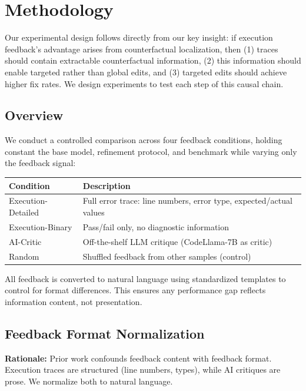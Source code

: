 \section{Methodology}
\label{sec:methodology}

Our experimental design follows directly from our key insight: if execution feedback's advantage arises from counterfactual localization, then (1) traces should contain extractable counterfactual information, (2) this information should enable targeted rather than global edits, and (3) targeted edits should achieve higher fix rates. We design experiments to test each step of this causal chain.

\subsection{Overview}

We conduct a controlled comparison across four feedback conditions, holding constant the base model, refinement protocol, and benchmark while varying only the feedback signal:

\begin{table}[h]
\centering
\begin{tabular}{ll}
\toprule
\textbf{Condition} & \textbf{Description} \\
\midrule
Execution-Detailed & Full error trace: line numbers, error type, expected/actual values \\
Execution-Binary & Pass/fail only, no diagnostic information \\
AI-Critic & Off-the-shelf LLM critique (CodeLlama-7B as critic) \\
Random & Shuffled feedback from other samples (control) \\
\bottomrule
\end{tabular}
\end{table}

All feedback is converted to natural language using standardized templates to control for format differences. This ensures any performance gap reflects information content, not presentation.

\subsection{Feedback Format Normalization}

\textbf{Rationale:} Prior work confounds feedback content with feedback format. Execution traces are structured (line numbers, types), while AI critiques are prose. We normalize both to natural language.

